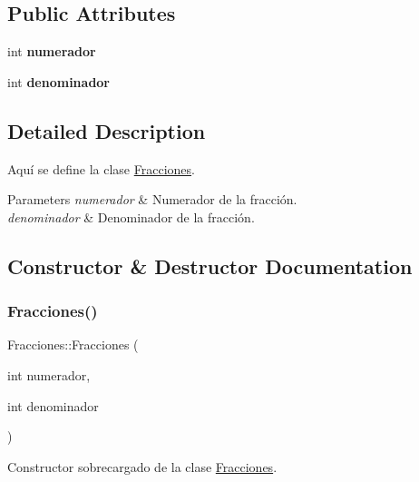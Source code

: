 \subsection*{Public Attributes}
\begin{DoxyCompactItemize}
\item 
\hypertarget{class_fracciones_adcde01ef0d094aa435a11c9806811478}{}\label{class_fracciones_adcde01ef0d094aa435a11c9806811478} 
int {\bfseries numerador}
\item 
\hypertarget{class_fracciones_a0f733a526179a6a3a26cbdb95ffa03f7}{}\label{class_fracciones_a0f733a526179a6a3a26cbdb95ffa03f7} 
int {\bfseries denominador}
\end{DoxyCompactItemize}


\subsection{Detailed Description}
Aquí se define la clase \hyperlink{class_fracciones}{Fracciones}. 


\begin{DoxyParams}{Parameters}
{\em numerador} & Numerador de la fracción. \\
\hline
{\em denominador} & Denominador de la fracción. \\
\hline
\end{DoxyParams}


\subsection{Constructor \& Destructor Documentation}
\hypertarget{class_fracciones_a23704ae511c81eccfe748de696b1950f}{}\label{class_fracciones_a23704ae511c81eccfe748de696b1950f} 
\subsubsection{\texorpdfstring{Fracciones()}{Fracciones()}\hspace{0.1cm}{\footnotesize\ttfamily [1/2]}}
{\ttfamily Fracciones\+::\+Fracciones (\begin{DoxyParamCaption}\item[{int}]{numerador,  }\item[{int}]{denominador }\end{DoxyParamCaption})}



Constructor sobrecargado de la clase \hyperlink{class_fracciones}{Fracciones}. 


